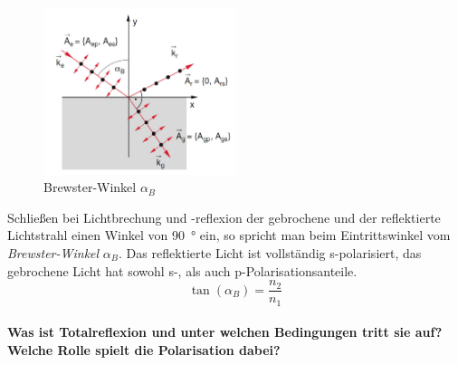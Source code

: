\documentclass[a4paper, 11pt, ngerman, parskip=half-]{scrartcl}
\begin{document}
\begin{figure}[H]
    \centering
    \begin{samepage}
        \includegraphics[width=0.5\textwidth]{image/15/brewster_hohenau.png}
        \caption{Brewster-Winkel $\alpha_B$}
        \label{fig:brewster-winkel}
    \end{samepage}
\end{figure}
%
Schließen bei Lichtbrechung und -reflexion der gebrochene und der reflektierte Lichtstrahl einen Winkel von \SI{90}{\degree} ein,
so spricht man beim Eintrittswinkel vom \textit{Brewster-Winkel} $\alpha_B$. Das reflektierte Licht ist vollständig s-polarisiert,
das gebrochene Licht hat sowohl s-, als auch p-Polarisationsanteile.
%
\begin{equation}
    \label{eq:brewster-winkel}
    \tan(\alpha_B) = \frac{n_2}{n_1}
\end{equation}
%
\paragraph{Was ist Totalreflexion und unter welchen Bedingungen tritt sie auf? Welche Rolle spielt die Polarisation dabei?}~\\
\end{document}
